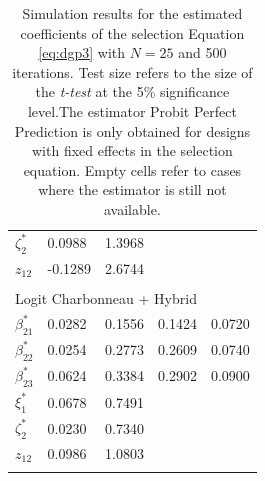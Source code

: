 \begin{table}
\begin{tabular}{p{3cm}p{1.8cm}p{1.8cm}p{1.8cm}p{1.8cm}}
     $\zeta_{2}^*$ & 0.0988 & 1.3968 & &\\
      $z_{12}$ & -0.1289 & 2.6744 &  & \\
      & & & & \\
    \hline
    \multicolumn{5}{l}{Logit Charbonneau + Hybrid} \\
    $\beta_{21}^*$ & 0.0282 & 0.1556  & 0.1424 &  0.0720\\
    $\beta_{22}^*$ & 0.0254 & 0.2773 & 0.2609 & 0.0740\\
    $\beta_{23}^*$ & 0.0624 & 0.3384 & 0.2902 & 0.0900\\
    $\xi_{1}^*$ & 0.0678 & 0.7491 &  & \\
    $\zeta_{2}^*$ & 0.0230 & 0.7340 & & \\
     $z_{12}$ & 0.0986 & 1.0803 &  & \\
     & & & & \\
   \hline
\end{tabular}
\caption{\footnotesize{Simulation results for the estimated coefficients of the selection Equation \ref{eq:dgp3} with $N=25$ and 500 iterations. Test size refers to the size of the \textit{t-test} at the 5\% significance level.The estimator Probit Perfect Prediction is only obtained for designs with fixed effects in the selection equation. Empty cells refer to cases where the estimator is still not available.}}
\label{tab:1}
\end{table}
